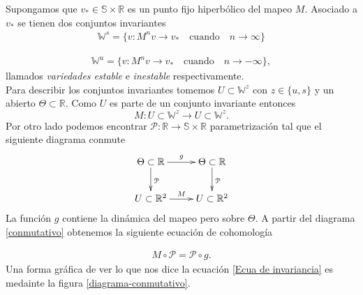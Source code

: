 
Supongamos que $v_{*}\in\mathbb{S} \times \mathbb{R}$ es un punto fijo hiperb\'olico del mapeo $M$. Asociado a $v_{*}$ se tienen dos conjuntos invariantes 
\begin{eqnarray}
\mathbb{W}^{s}=\lbrace v : M^{n}v\rightarrow v_{*} \quad \mathrm{cuando} \quad n\rightarrow \infty \rbrace
\label{variedad estable}
\end{eqnarray}

\begin{eqnarray}
\mathbb{W}^{u}=\lbrace v : M^{n}v\rightarrow v_{*} \quad \mathrm{cuando} \quad n\rightarrow -\infty \rbrace
\label{variedad inestable},
\end{eqnarray}
llamados \textit{variedades estable} e \textit{inestable} respectivamente. \\

Para describir los conjuntos invariantes tomemos  $U\subset \mathbb{W}^{z}$ con $z\in \{u,s\}$ y un abierto $\Theta \subset \mathbb{R}$. Como $U$ es parte de un conjunto invariante entonces
\begin{equation}
M : U\subset \mathbb{W}^{z} \longrightarrow  U\subset \mathbb{W}^{z}.
\end{equation}
Por otro lado podemos encontrar $\mathcal{P}:\mathbb{R}\longrightarrow\mathbb{S} \times \mathbb{R}$ parametrizaci\'on tal que el siguiente diagrama conmute
\begin{eqnarray}
\xymatrix{
	\Theta\subset\mathbb{R} \ar[d]^{\mathcal{P}} \ar[r]^{g} & \Theta\subset\mathbb{R} \ar[d]^{\mathcal{P}} \\
	U\subset\mathbb{R}^{2} \ar[r]^{M} & U\subset\mathbb{R}^{2}
}\label{conmutativo}
\end{eqnarray}
La funci\'on $g$ contiene la dinámica del mapeo pero sobre $\Theta$. A partir del diagrama \ref{conmutativo} obtenemos la siguiente ecuaci\'on de cohomolog\'ia

\begin{eqnarray}
M \circ \mathcal{P} =\mathcal{P}  \circ g  \label{Ecua de invariancia}.
\end{eqnarray}
Una forma gr\'afica de ver lo que nos dice la ecuaci\'on \ref{Ecua de invariancia} es medainte la figura 
\ref{diagrama-conmutativo}.

